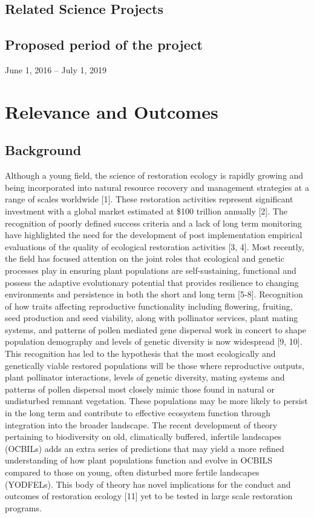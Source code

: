\documentclass[version=last,
    paper=a4,                               %
    10pt,                                   %
    dvipsnames,
    oneside,                              %
    headings=openany,                       %
    open=any,
    BCOR=7mm,                               %
    DIV=15,     %
]{scrbook}
\begin{document}
\subsection*{Related Science Projects}




\subsection*{Proposed period of the project}
June 1, 2016 -- July 1, 2019



\section*{Relevance and Outcomes}


\subsection*{Background}

Although a young field, the science of restoration ecology is rapidly
growing and being incorporated into natural resource recovery and
management strategies at a range of scales worldwide {[}1{]}. These
restoration activities represent significant investment with a global
market estimated at \$100 trillion annually {[}2{]}. The recognition of
poorly defined success criteria and a lack of long term monitoring have
highlighted the need for the development of post implementation
empirical evaluations of the quality of ecological restoration
activities {[}3, 4{]}. Most recently, the field has focused attention on
the joint roles that ecological and genetic processes play in ensuring
plant populations are self-sustaining, functional and possess the
adaptive evolutionary potential that provides resilience to changing
environments and persistence in both the short and long term {[}5-8{]}.
Recognition of how traits affecting reproductive functionality including
flowering, fruiting, seed production and seed viability, along with
pollinator services, plant mating systems, and patterns of pollen
mediated gene dispersal work in concert to shape population demography
and levels of genetic diversity is now widespread {[}9, 10{]}. This
recognition has led to the hypothesis that the most ecologically and
genetically viable restored populations will be those where reproductive
outputs, plant pollinator interactions, levels of genetic diversity,
mating systems and patterns of pollen dispersal most closely mimic those
found in natural or undisturbed remnant vegetation. These populations
may be more likely to persist in the long term and contribute to
effective ecosystem function through integration into the broader
landscape. The recent development of theory pertaining to biodiversity
on old, climatically buffered, infertile landscapes (OCBILs) adds an
extra series of predictions that may yield a more refined understanding
of how plant populations function and evolve in OCBILS compared to those
on young, often disturbed more fertile landscapes (YODFELs). This body
of theory has novel implications for the conduct and outcomes of
restoration ecology {[}11{]} yet to be tested in large scale restoration
programs.
\end{document}

